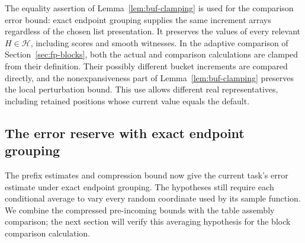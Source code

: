 The equality assertion of Lemma~\ref{lem:buf-clamping} is used for the
comparison error bound: exact endpoint grouping supplies the same increment
arrays regardless of the chosen list presentation.  It preserves the
values of every relevant $H\in\mathcal H$, including scores and smooth
witnesses.
In the adaptive comparison of Section~\ref{sec:fp-blocks}, both the actual
and comparison calculations are clamped from their definition.  Their
possibly different bucket increments are compared directly, and the
nonexpansiveness part of Lemma~\ref{lem:buf-clamping} preserves the local
perturbation bound.  This use allows different real representatives,
including retained positions whose current value equals the default.

\subsection{The error reserve with exact endpoint grouping}

The prefix estimates and compression bound now give the current task's
error estimate under exact endpoint grouping.  The hypotheses still
require each conditional average to vary every random coordinate used
by its sample function.  We combine the compressed pre-incoming bounds
with the table assembly comparison; the next section will verify this
averaging hypothesis for the block comparison calculation.

